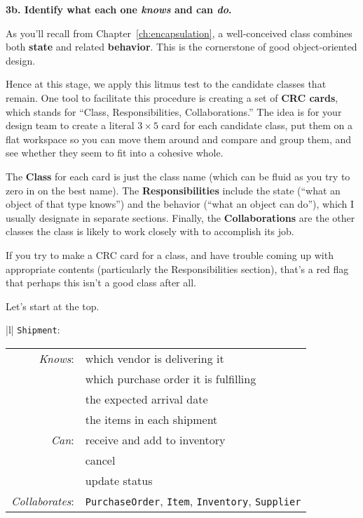 \vspace{.1in}


\textbf{3b. Identify what each one \textit{knows} and can \textit{do}.}

As you'll recall from Chapter~\ref{ch:encapsulation}, a well-conceived class
combines both \textbf{state} and related \textbf{behavior}. This is the
cornerstone of good object-oriented design.

Hence at this stage, we apply this litmus test to the candidate classes that
remain. One tool to facilitate this procedure is creating a set of \textbf{CRC
cards}, which stands for ``Class, Responsibilities, Collaborations.'' The idea
is for your design team to create a literal $3\times5$ card for each candidate
class, put them on a flat workspace so you can move them around and compare
and group them, and see whether they seem to fit into a cohesive whole.

The \textbf{Class} for each card is just the class name (which can be fluid as
you try to zero in on the best name). The \textbf{Responsibilities} include the
state (``what an object of that type knows'') and the behavior (``what an
object can do''), which I usually designate in separate sections. Finally, the
\textbf{Collaborations} are the other classes the class is likely to work
closely with to accomplish its job.

If you try to make a CRC card for a class, and have trouble coming up with
appropriate contents (particularly the Responsibilities section), that's a red
flag that perhaps this isn't a good class after all.

\pagebreak
\begin{samepage}
Let's start at the top.

\bigskip
{}
\begin{center}
\begin{tabular}{|l|}
\hline
\texttt{Shipment}:\\
\hline
\begin{tabular}{rl}
\textit{Knows}: & which vendor is delivering it\\
& which purchase order it is fulfilling\\
& the expected arrival date\\
& the items in each shipment \\
\textit{Can}: & receive and add to inventory\\
& cancel \\
& update status \\
\hline
\textit{Collaborates}: & \texttt{PurchaseOrder}, \texttt{Item}, \texttt{Inventory}, \texttt{Supplier}\\
\end{tabular}\\
\hline
\end{tabular}
\end{center}
\end{samepage}
\bigskip

